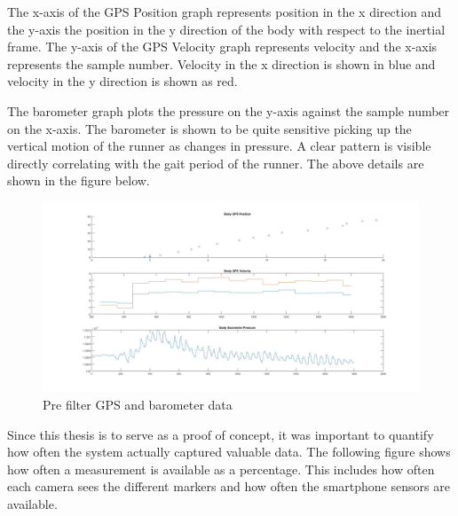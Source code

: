 \newpage

The x-axis of the GPS Position graph represents position in the x direction and the y-axis the position in the y direction of the body with respect to the inertial frame. The y-axis of the GPS Velocity graph represents velocity and the x-axis represents the sample number. Velocity in the x direction is shown in blue and velocity in the y direction is shown as red.

The barometer graph plots the pressure on the y-axis against the sample number on the x-axis. The barometer is shown to be quite sensitive picking up the vertical motion of the runner as changes in pressure. A clear pattern is visible directly correlating with the gait period of the runner. The above details are shown in the figure below.

\begin{figure}[!ht] 
\captionsetup{width=0.8\linewidth, font=small}  
\includegraphics[width=1\linewidth]{figures/gps.jpg}
\caption{Pre filter GPS and barometer data}
\label{fig:gps}
\end{figure}




\newpage
Since this thesis is to serve as a proof of concept, it was important to quantify how often the system actually captured valuable data. The following figure shows how often a measurement is available as a percentage. This includes how often each camera sees the different markers and how often the smartphone sensors are available.

